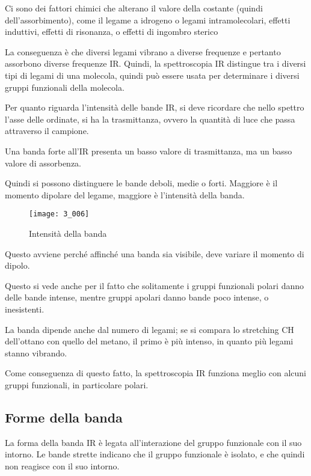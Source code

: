 Ci sono dei fattori chimici che alterano il valore della costante
(quindi dell'assorbimento), come il legame a idrogeno o legami intramolecolari,
effetti induttivi, effetti di risonanza, o effetti di ingombro sterico

La conseguenza è che diversi legami vibrano a diverse frequenze e
pertanto assorbono diverse frequenze IR. Quindi, la spettroscopia IR
distingue tra i diversi tipi di legami di una molecola, quindi può
essere usata per determinare i diversi gruppi funzionali della molecola.

Per quanto riguarda l'intensità delle bande IR, si deve ricordare che
nello spettro l'asse delle ordinate, si ha la trasmittanza, ovvero la
quantità di luce che passa attraverso il campione.

Una banda forte all'IR presenta un basso valore di trasmittanza, ma un
basso valore di assorbenza.

Quindi si possono distinguere le bande deboli, medie o forti. Maggiore è
il momento dipolare del legame, maggiore è l'intensità della banda.

\begin{figure}[H]
    \texttt{[image: 3\_006]}
    \caption{Intensità della banda}
\end{figure}

Questo avviene perché affinché una banda sia visibile, deve variare il
momento di dipolo.

Questo si vede anche per il fatto che solitamente i gruppi funzionali
polari danno delle bande intense, mentre gruppi apolari danno bande poco
intense, o inesistenti.

La banda dipende anche dal numero di legami; se si compara lo stretching
CH dell'ottano con quello del metano, il primo è più intenso, in quanto
più legami stanno vibrando.

Come conseguenza di questo fatto, la spettroscopia IR funziona meglio
con alcuni gruppi funzionali, in particolare polari.

\subsection{Forme della banda}

La forma della banda IR è legata all'interazione del gruppo funzionale
con il suo intorno. Le bande strette indicano che il gruppo funzionale è
isolato, e che quindi non reagisce con il suo intorno.


